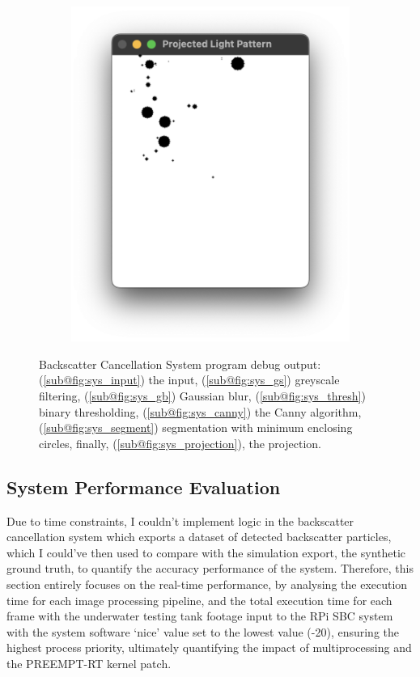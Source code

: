 \begin{figure}[H]
\begin{subfigure}{.39\textwidth}
        \includegraphics[width=1\linewidth]{assets/sys_project.png}
        \caption{}
        \label{fig:sys_projection}
    \end{subfigure}
    \caption{Backscatter Cancellation System program debug output: (\ref{sub@fig:sys_input}) the input, (\ref{sub@fig:sys_gs}) greyscale filtering, (\ref{sub@fig:sys_gb}) Gaussian blur, (\ref{sub@fig:sys_thresh}) binary thresholding, (\ref{sub@fig:sys_canny}) the Canny algorithm, (\ref{sub@fig:sys_segment}) segmentation with minimum enclosing circles, finally, (\ref{sub@fig:sys_projection}), the projection.}
    \label{fig:sys_flow_visual}
\end{figure}

\subsection{System Performance Evaluation}

Due to time constraints, I couldn't implement logic in the backscatter cancellation system which exports a dataset of detected backscatter particles, which I could've then used to compare with the simulation export, the synthetic ground truth, to quantify the accuracy performance of the system. Therefore, this section entirely focuses on the real-time performance, by analysing the execution time for each image processing pipeline, and the total execution time for each frame with the underwater testing tank footage input to the RPi SBC system with the system software `nice' value set to the lowest value (-20), ensuring the highest process priority, ultimately quantifying the impact of multiprocessing and the PREEMPT-RT kernel patch.

